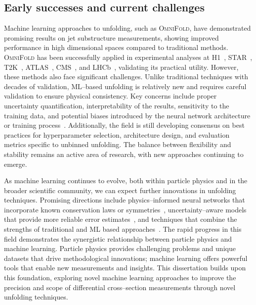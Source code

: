     \subsection{Early successes and current challenges}
        Machine learning approaches to unfolding, such as \textsc{OmniFold}, have demonstrated promising results on jet substructure measurements, showing improved performance in high dimensional spaces compared to traditional methods.
        \textsc{OmniFold} has been successfully applied in experimental analyses at H1~\cite{collaboration_measurement_2022, collaboration_unbinned_2023, collaboration_machine_2024, Arratia2025TowardsEvents}, STAR~\cite{song_measurement_2023, pani_generalized_2024}, T2K~\cite{Huang2025MachineTechnique}, ATLAS~\cite{collaboration_simultaneous_2024, collaboration_measurement_2025}, CMS~\cite{collaboration_measurement_2025}, and LHCb~\cite{collaboration_multidifferential_2023}, validating its practical utility.
        However, these methods also face significant challenges.
        Unlike traditional techniques with decades of validation, ML--based unfolding is relatively new and requires careful validation to ensure physical consistency.
        Key concerns include proper uncertainty quantification, interpretability of the results, sensitivity to the training data, and potential biases introduced by the neural network architecture or training process~\cite{mishra_uncertainty_2021}.
        Additionally, the field is still developing consensus on best practices for hyperparameter selection, architecture design, and evaluation metrics specific to unbinned unfolding.
        The balance between flexibility and stability remains an active area of research, with new approaches continuing to emerge.

        As machine learning continues to evolve, both within particle physics and in the broader scientific community, we can expect further innovations in unfolding techniques.
        Promising directions include physics--informed neural networks that incorporate known conservation laws or symmetries~\cite{raissi_physics-informed_2019}, uncertainty--aware models that provide more reliable error estimates~\cite{brehmer_guide_2018}, and techniques that combine the strengths of traditional and ML based approaches~\cite{willard_integrating_2022}.
        The rapid progress in this field demonstrates the synergistic relationship between particle physics and machine learning.
        Particle physics provides challenging problems and unique datasets that drive methodological innovations;
        machine learning offers powerful tools that enable new measurements and insights.
        This dissertation builds upon this foundation, exploring novel machine learning approaches to improve the precision and scope of differential cross--section measurements through novel unfolding techniques.

